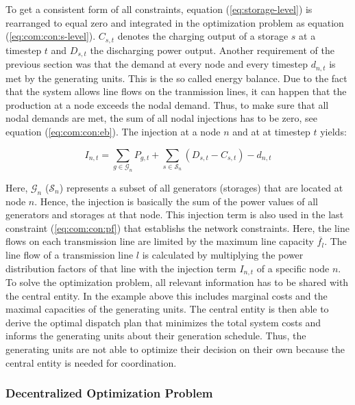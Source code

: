 To get a consistent form of all constraints, equation (\ref{eq:storage-level}) is rearranged to equal zero and integrated in the optimization problem as equation (\ref{eq:com:con:s-level}). $C_{s,t}$ denotes the charging output of a storage $s$ at a timestep $t$ and $D_{s,t}$ the discharging power output. Another requirement of the previous section was that the demand at every node and every timestep $d_{n,t}$ is met by the generating units. This is the so called energy balance. Due to the fact that the system allows line flows on the tranmission lines, it can happen that the production at a node exceeds the nodal demand. Thus, to make sure that all nodal demands are met, the sum of all nodal injections has to be zero, see equation (\ref{eq:com:con:eb}). The injection at a node $n$ and at at timestep $t$ yields:

\begin{equation}
	I_{n,t} = \sum_{g\in\mathcal{G}_n}P_{g,t} + \sum_{s\in\mathcal{S}_n}(D_{s,t}-C_{s,t})-d_{n,t}
	\label{eq:injection-term}
\end{equation}

Here, $\mathcal{G}_n$ ($\mathcal{S}_n$) represents a subset of all generators (storages) that are located at node $n$. Hence, the injection is basically the sum of the power values of all generators and storages at that node. This injection term is also used in the last constraint (\ref{eq:com:con:pf}) that establishs the network constraints. Here, the line flows on each transmission line are limited by the maximum line capacity $\overline{f_l}$. The line flow of a transmission line $l$ is calculated by multiplying the power distribution factors of that line with the injection term $I_{n,t}$ of a specific node $n$.\\

	
To solve the optimization problem, all relevant information has to be shared with the central entity. In the example above this includes marginal costs and the maximal capacities of the generating units. The central entity is then able to derive the optimal dispatch plan that minimizes the total system costs and informs the generating units about their generation schedule. Thus, the generating units are not able to optimize their decision on their own because the central entity is needed for coordination.	

\subsubsection{Decentralized Optimization Problem}
\label{sec:app:dom}

